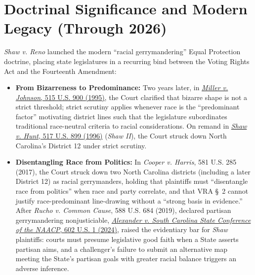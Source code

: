 \documentclass[12pt]{article}
\begin{document}
\section{Doctrinal Significance and Modern Legacy (Through 2026)}
\textit{Shaw v. Reno} launched the modern ``racial gerrymandering'' Equal Protection doctrine, placing state legislatures in a recurring bind between the Voting Rights Act and the Fourteenth Amendment:
\begin{itemize}
  \item \textbf{From Bizarreness to Predominance:} Two years later, in \href{https://supreme.justia.com/cases/federal/us/515/900/}{\textit{Miller v. Johnson}, 515 U.S. 900 (1995)}, the Court clarified that bizarre shape is not a strict threshold; strict scrutiny applies whenever race is the ``predominant factor'' motivating district lines such that the legislature subordinates traditional race-neutral criteria to racial considerations. On remand in \href{https://supreme.justia.com/cases/federal/us/517/899/}{\textit{Shaw v. Hunt}, 517 U.S. 899 (1996)} (\textit{Shaw II}), the Court struck down North Carolina's District 12 under strict scrutiny.
  \item \textbf{Disentangling Race from Politics:} In \textit{Cooper v. Harris}, 581 U.S. 285 (2017), the Court struck down two North Carolina districts (including a later District 12) as racial gerrymanders, holding that plaintiffs must ``disentangle race from politics'' when race and party correlate, and that VRA \S~2 cannot justify race-predominant line-drawing without a ``strong basis in evidence.'' After \textit{Rucho v. Common Cause}, 588 U.S. 684 (2019), declared partisan gerrymandering nonjusticiable, \href{https://supreme.justia.com/cases/federal/us/602/22-807/}{\textit{Alexander v. South Carolina State Conference of the NAACP}, 602 U.S. 1 (2024)}, raised the evidentiary bar for \textit{Shaw} plaintiffs: courts must presume legislative good faith when a State asserts partisan aims, and a challenger's failure to submit an alternative map meeting the State's partisan goals with greater racial balance triggers an adverse inference.

\end{itemize}
\end{document}
